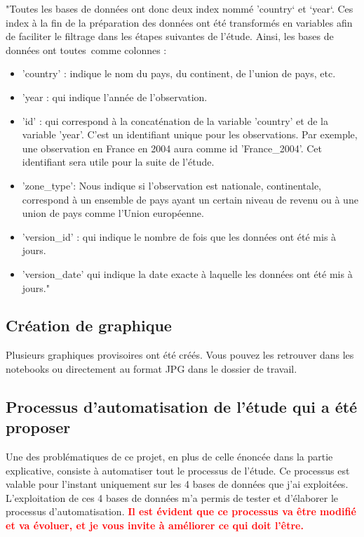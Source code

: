 \documentclass[12pt]{article}
\begin{document}
"Toutes les bases de données ont donc deux index nommé ’country` et `year`. 
Ces index à la fin de la préparation des données ont été transformés en variables afin de faciliter le 
filtrage dans les étapes suivantes de l'étude. Ainsi, les bases de données ont toutes comme colonnes :
\begin{itemize}
    \renewcommand{\labelitemi}{-}
    \item 'country' : indique le nom du pays, du continent, de l'union de pays, etc.
    \item 'year : qui indique l'année de l'observation.
    \item 'id' : qui correspond à la concaténation de la variable 'country' et de la variable 'year'. 
    C’est un identifiant unique pour les observations. Par exemple, une observation en France en 2004 
    aura comme id 'France\_2004'. Cet identifiant sera utile pour la suite de l'étude.
    \item 'zone\_type': Nous indique si l'observation est nationale, continentale, correspond à un 
    ensemble de pays ayant un certain niveau de revenu ou à une union de pays comme l'Union européenne.
    \item 'version\_id' : qui indique le nombre de fois que les données ont été mis à jours.
    \item 'version\_date' qui indique la date exacte à laquelle les données ont été mis à jours."\cite{memoir}
\end{itemize}

\subsection{Création de graphique}

Plusieurs graphiques provisoires ont été créés. Vous pouvez les retrouver dans les notebooks ou
directement au format JPG dans le dossier de travail.

\subsection{Processus d'automatisation de l'étude qui a été proposer}

Une des problématiques de ce projet, en plus de celle énoncée dans la partie explicative, 
consiste à automatiser tout le processus de l'étude. 
Ce processus est valable pour l'instant uniquement sur les 4 bases de données que j'ai exploitées. 
L'exploitation de ces 4 bases de données m'a permis de tester et d'élaborer le processus d'automatisation.
\textbf{\textcolor{red}{Il est évident que ce processus va être modifié et va évoluer, et 
je vous invite à améliorer ce qui doit l'être.}} \newline
\end{document}
